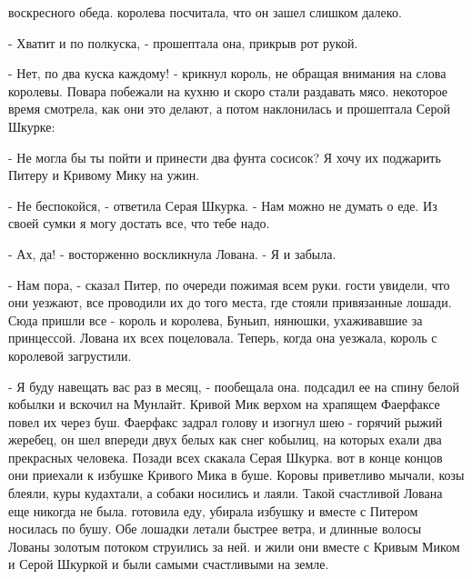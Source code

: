 воскресного обеда.
 королева посчитала, что он зашел слишком далеко.
\par- Хватит и по полкуска, - прошептала она, прикрыв рот рукой.
\par- Нет, по два куска каждому! - крикнул король, не обращая внимания 
на слова королевы. Повара побежали на кухню и скоро стали раздавать 
мясо.
 некоторое время смотрела, как они это делают, а потом 
наклонилась и прошептала Серой Шкурке:
\par- Не могла бы ты пойти и принести два фунта сосисок? Я хочу их 
поджарить Питеру и Кривому Мику на ужин.
\par- Не беспокойся, - ответила Серая Шкурка. - Нам можно не думать о 
еде. Из своей сумки я могу достать все, что тебе надо.
\par- Ах, да! - восторженно воскликнула Лована. - Я и забыла.
\par- Нам пора, - сказал Питер, по очереди пожимая всем руки.
 гости увидели, что они уезжают, все проводили их до того 
места, где стояли привязанные лошади. Сюда пришли все - король и 
королева, Буньип, нянюшки, ухаживавшие за принцессой. Лована их всех 
поцеловала. Теперь, когда она уезжала, король с королевой загрустили.
\par- Я буду навещать вас раз в месяц, - пообещала она.
 подсадил ее на спину белой кобылки и вскочил на Мунлайт. 
Кривой Мик верхом на храпящем Фаерфаксе повел их через буш. Фаерфакс 
задрал голову и изогнул шею - горячий рыжий жеребец, он шел впереди 
двух белых как снег кобылиц, на которых ехали два прекрасных человека. 
Позади всех скакала Серая Шкурка.
 вот в конце концов они приехали к избушке Кривого Мика в буше. 
Коровы приветливо мычали, козы блеяли, куры кудахтали, а собаки 
носились и лаяли. Такой счастливой Лована еще никогда не была.
 готовила еду, убирала избушку и вместе с Питером носилась по 
бушу. Обе лошадки летали быстрее ветра, и длинные волосы Лованы 
золотым потоком струились за ней.
 и жили они вместе с Кривым Миком и Серой Шкуркой и были самыми 
счастливыми на земле.
